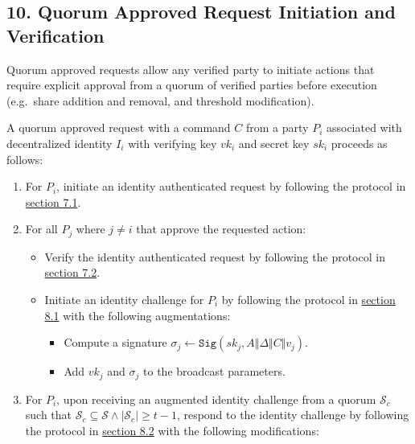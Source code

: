 \documentclass[
]{article}
\providecommand{\tightlist}{%
  \setlength{\itemsep}{0pt}\setlength{\parskip}{0pt}}
\begin{document}
\hypertarget{quorum-approved-request}{%
\subsection{10. Quorum Approved Request Initiation and
Verification}\label{quorum-approved-request}}

Quorum approved requests allow any verified party to initiate actions
that require explicit approval from a quorum of verified parties before
execution (e.g.~share addition and removal, and threshold modification).

A quorum approved request with a command \(C\) from a party \(P_i\)
associated with decentralized identity \(I_i\) with verifying key
\(vk_i\) and secret key \(sk_i\) proceeds as follows:

\begin{enumerate}
\def\labelenumi{\arabic{enumi}.}
\tightlist
\item
  For \(P_i\), initiate an identity authenticated request by following
  the protocol in
  \protect\hyperlink{identity-authed-request-initiation}{section 7.1}.
\item
  For all \(P_j\) where \(j \neq i\) that approve the requested action:

  \begin{itemize}
  \tightlist
  \item
    Verify the identity authenticated request by following the protocol
    in \protect\hyperlink{identity-authed-request-verification}{section
    7.2}.
  \item
    Initiate an identity challenge for \(P_i\) by following the protocol
    in \protect\hyperlink{identity-challenge-initiation}{section 8.1}
    with the following augmentations:

    \begin{itemize}
    \tightlist
    \item
      Compute a signature
      \(\sigma _j \leftarrow \mathtt{Sig}(sk_j, A \Vert \Delta \Vert C \Vert v_j)\).
    \item
      Add \(vk_j\) and \(\sigma _j\) to the broadcast parameters.
    \end{itemize}
  \end{itemize}
\item
  For \(P_i\), upon receiving an augmented identity challenge from a
  quorum \(\mathcal{S} _c\) such that
  \(\mathcal{S} _c \subseteq \mathcal{S} \land |\mathcal{S} _c| \geq t - 1\),
  respond to the identity challenge by following the protocol in
  \protect\hyperlink{identity-challenge-response}{section 8.2} with the
  following modifications:


\end{enumerate}
\end{document}
